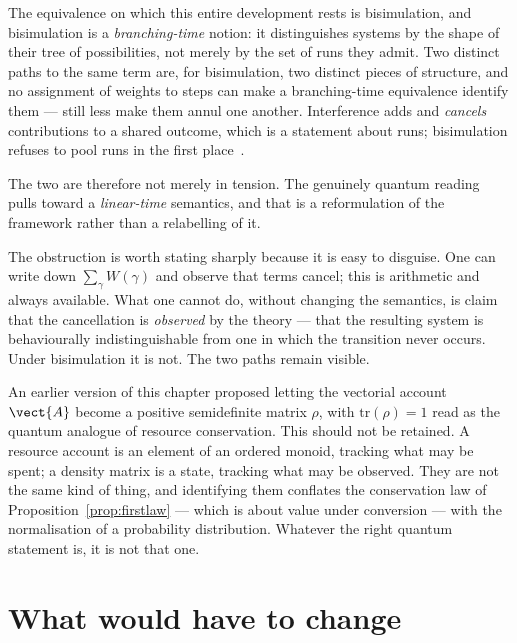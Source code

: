 \begin{remark}
\label{rmk:obstruction}
The equivalence on which this entire development rests is bisimulation,
and bisimulation is a \emph{branching-time} notion: it distinguishes
systems by the shape of their tree of possibilities, not merely by the set
of runs they admit.  Two distinct paths to the same term are, for
bisimulation, two distinct pieces of structure, and no assignment of
weights to steps can make a branching-time equivalence identify them ---
still less make them annul one another.  Interference adds and
\emph{cancels} contributions to a shared outcome, which is a statement
about runs; bisimulation refuses to pool runs in the first
place~\cite[\S13]{CE}.

The two are therefore not merely in tension.  The genuinely quantum
reading pulls toward a \emph{linear-time} semantics, and that is a
reformulation of the framework rather than a relabelling of it.
\end{remark}

The obstruction is worth stating sharply because it is easy to disguise.
One can write down $\sum_\gamma W(\gamma)$ and observe that terms cancel;
this is arithmetic and always available.  What one cannot do, without
changing the semantics, is claim that the cancellation is \emph{observed}
by the theory --- that the resulting system is behaviourally
indistinguishable from one in which the transition never occurs.  Under
bisimulation it is not.  The two paths remain visible.

\begin{remark}
An earlier version of this chapter proposed letting the vectorial account
$\vect{A}$ become a positive semidefinite matrix $\rho$, with
$\mathrm{tr}(\rho)=1$ read as the quantum analogue of resource
conservation.  This should not be retained.  A resource account is an
element of an ordered monoid, tracking what may be spent; a density matrix
is a state, tracking what may be observed.  They are not the same kind of
thing, and identifying them conflates the conservation law of
Proposition~\ref{prop:firstlaw} --- which is about value under conversion
--- with the normalisation of a probability distribution.  Whatever the
right quantum statement is, it is not that one.
\end{remark}

\section{What would have to change}

